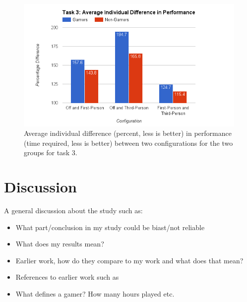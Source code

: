 \documentclass[runningheads,a4paper,oribibl]{llncs}
\begin{document}
\begin{figure}
   \centering
   \includegraphics[width=\textwidth]{ExternalMaterial/Task3GraphD}
   \caption{Average individual difference (percent, less is better) in performance (time required, less is better) between two configurations for the two groups for task 3.} \label{fig:Task3GraphD}
\end{figure}














\section{Discussion}
A general discussion about the study such as:
\begin{itemize}
	\item What part/conclusion in my study could be biast/not reliable
	\item What does my results mean?
	\item Earlier work, how do they compare to my work and what does that mean?
	\item References to earlier work such as~\cite{schmierbach2011exploring}
	\item What defines a gamer? How many hours played etc.
\end{itemize}
\end{document}
